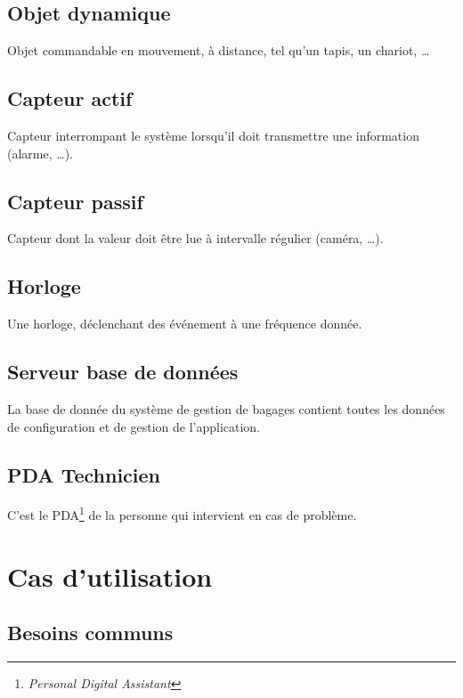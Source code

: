 \subsection{Objet dynamique}
\label{obj}
Objet commandable en mouvement, à distance, tel qu'un tapis, un chariot, \ldots

\subsection{Capteur actif}
\label{sensor}
Capteur interrompant le système lorsqu'il doit transmettre une information (alarme, \ldots).

\subsection{Capteur passif}

Capteur dont la valeur doit être lue à intervalle régulier (caméra, \ldots).
\label{passiveSensor}

\subsection{Horloge}
\label{clock}
Une horloge, déclenchant des événement à une fréquence donnée.

\subsection{Serveur base de données}
\label{bdd}
La base de donnée du système de gestion de bagages contient toutes les données de configuration et de gestion de l'application.

\subsection{PDA Technicien}
\label{pda}
C'est le PDA\footnote{\textsl{Personal Digital Assistant}} de la personne qui intervient en cas de problème.



\section{Cas d'utilisation}

\subsection{Besoins communs}

